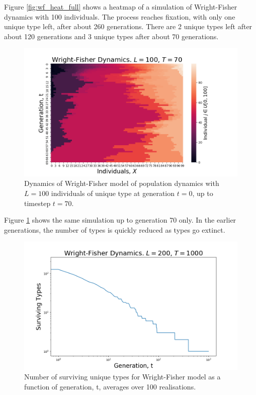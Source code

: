 \documentclass{article}
\begin{document}
Figure \ref{fig:wf_heat_full} shows a heatmap of a simulation of Wright-Fisher dynamics with 100 individuals.  The process reaches fixation, with only one unique type left, after about 260 generations. There are 2 unique types left after about 120 generations and 3 unique types after about 70 generations. 

\begin{figure}[H]
\includegraphics[scale=0.6]{Wright-Fisher-70_a.png} 
\caption{Dynamics of Wright-Fisher model of population dynamics with $L=100$ individuals of unique type at generation $t=0$, up to timestep $t=70$.}
\label{fig:wf_heat_70}
\end{figure}
 
Figure \ref{fig:wf_heat_70} shows the same simulation up to generation 70 only. In the earlier generations, the number of types is quickly reduced as types go extinct.  

\begin{figure}[H]
\includegraphics[scale=0.5]{Wright-Fisher_trend_a.png} 
\caption{Number of surviving unique types for Wright-Fisher model as a function of generation, t, averages over 100 realisations.}
\label{fig:wf_trend}
\end{figure}
\end{document}
